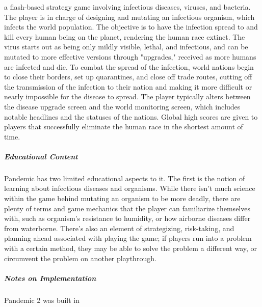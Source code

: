 a flash-based strategy game involving infectious diseases, viruses, and bacteria. The player is in charge of designing and mutating an infectious organism, which infects the world population. The objective is to have the infection spread to and kill every human being on the planet, rendering the human race extinct. The virus starts out as being only mildly visible, lethal, and infectious, and can be mutated to more effective versions through "upgrades," received as more humans are infected and die. To combat the spread of the infection, world nations begin to close their borders, set up quarantines, and close off trade routes, cutting off the transmission of the infection to their nation and making it more difficult or nearly impossible for the disease to spread. The player typically alters between the disease upgrade screen and the world monitoring screen, which includes notable headlines and the statuses of the nations. Global high scores are given to players that successfully eliminate the human race in the shortest amount of time.\subparagraph{Educational Content}Pandemic has two limited educational aspects to it. The first is the notion of learning about infectious diseases and organisms. While there isn't much science within the game behind mutating an organism to be more deadly, there are plenty of terms and game mechanics that the player can familiarize themselves with, such as organism's resistance to humidity, or how airborne diseases differ from waterborne. There's also an element of strategizing, risk-taking, and planning ahead associated with playing the game; if players run into a problem with a certain method, they may be able to solve the problem a different way, or circumvent the problem on another playthrough.\subparagraph{Notes on Implementation}Pandemic 2 was built in 